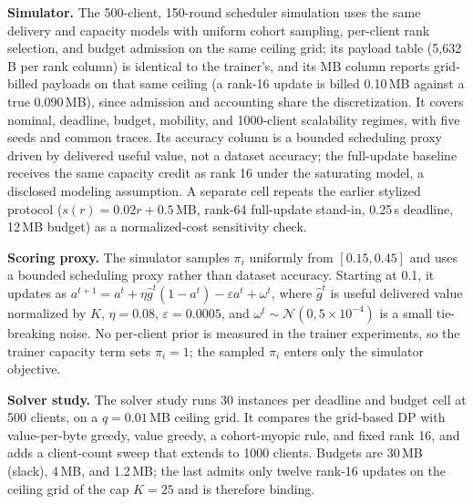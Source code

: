 \documentclass[a4paper,fleqn]{cas-dc}
\begin{document}
\textbf{Simulator.} The 500-client, 150-round scheduler simulation uses the same delivery and capacity models with uniform cohort sampling, per-client rank selection, and budget admission on the same ceiling grid; its payload table (5,632\,B per rank column) is identical to the trainer's, and its MB column reports grid-billed payloads on that same ceiling (a rank-16 update is billed 0.10\,MB against a true 0.090\,MB), since admission and accounting share the discretization. It covers nominal, deadline, budget, mobility, and 1000-client scalability regimes, with five seeds and common traces. Its accuracy column is a bounded scheduling proxy driven by delivered useful value, not a dataset accuracy; the full-update baseline receives the same capacity credit as rank 16 under the saturating model, a disclosed modeling assumption. A separate cell repeats the earlier stylized protocol ($s(r)=0.02r+0.5$\,MB, rank-64 full-update stand-in, 0.25\,s deadline, 12\,MB budget) as a normalized-cost sensitivity check.

\textbf{Scoring proxy.} The simulator samples $\pi_i$ uniformly from $[0.15,0.45]$ and uses a bounded scheduling proxy rather than dataset accuracy. Starting at 0.1, it updates as $a^{t+1}=a^t+\eta\hat g^t(1-a^t)-\varepsilon a^t+\omega^t$, where $\hat g^t$ is useful delivered value normalized by $K$, $\eta=0.08$, $\varepsilon=0.0005$, and $\omega^t\sim\mathcal N(0,5\times10^{-4})$ is a small tie-breaking noise. No per-client prior is measured in the trainer experiments, so the trainer capacity term sets $\pi_i{=}1$; the sampled $\pi_i$ enters only the simulator objective.

\textbf{Solver study.} The solver study runs 30 instances per deadline and budget cell at 500 clients, on a $q{=}0.01$\,MB ceiling grid. It compares the grid-based DP with value-per-byte greedy, value greedy, a cohort-myopic rule, and fixed rank 16, and adds a client-count sweep that extends to 1000 clients. Budgets are 30\,MB (slack), 4\,MB, and 1.2\,MB; the last admits only twelve rank-16 updates on the ceiling grid of the cap $K{=}25$ and is therefore binding.
\end{document}
